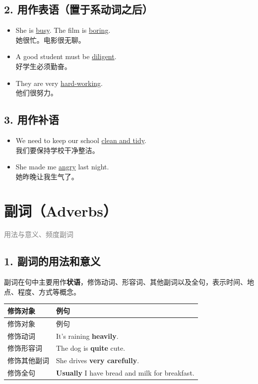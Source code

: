 \documentclass[11pt,a4paper]{ctexart}
\begin{document}
\subsection*{2. 用作表语（置于系动词之后）}

\begin{itemize}[leftmargin=1.4em]
\item She is \underline{busy}. The film is \underline{boring}.\\ 她很忙。电影很无聊。
\item A good student must be \underline{diligent}.\\ 好学生必须勤奋。
\item They are very \underline{hard-working}.\\ 他们很努力。
\end{itemize}

\subsection*{3. 用作补语}

\begin{itemize}[leftmargin=1.4em]
\item We need to keep our school \underline{clean and tidy}.\\ 我们要保持学校干净整洁。
\item She made me \underline{angry} last night.\\ 她昨晚让我生气了。
\end{itemize}

\begin{center}\end{center}

\section{副词（Adverbs）}
\noindent\textcolor{gray}{用法与意义、频度副词}\par\smallskip
\subsection*{1. 副词的用法和意义}

副词在句中主要用作\textbf{状语}，修饰动词、形容词、其他副词以及全句，表示时间、地点、程度、方式等概念。

{\footnotesize
\begin{longtable}{p{6.70cm}p{6.70cm}}
\hline
修饰对象 & 例句 \\
\hline
\endfirsthead
\hline
修饰对象 & 例句 \\
\hline
\endhead
\hline
\endfoot
修饰动词 & It’s raining \textbf{heavily}. \\
修饰形容词 & The dog is \textbf{quite} cute. \\
修饰其他副词 & She drives \textbf{very carefully}. \\
修饰全句 & \textbf{Usually} I have bread and milk for breakfast. \\
\end{longtable}
}
\end{document}
